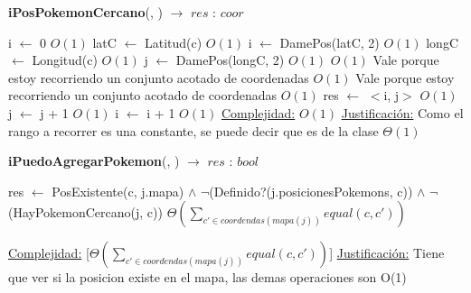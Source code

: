 \begin{algorithm}[H]{\textbf{iPosPokemonCercano}(, )  $\to$ $res$ : $coor$} 
	{}
	\begin{algorithmic}
		\State i $\gets$ 0 \Comment $O(1)$
		\State latC $\gets$ Latitud(c)	\Comment $O(1)$
		\State i $\gets$ DamePos(latC, 2) \Comment $O(1)$		
		\State longC $\gets$ Longitud(c)	\Comment $O(1)$
		\State j $\gets$ DamePos(longC, 2) \Comment $O(1)$
			\Comment $O(1)$ {Vale porque estoy recorriendo un conjunto acotado de coordenadas}
				\Comment $O(1)$ {Vale porque estoy recorriendo un conjunto acotado de coordenadas}
					\Comment $O(1)$
					\State res $\gets$ $<$i, j$>$	\Comment $O(1)$ 
				\EndIf
				\State j $\gets$ j + 1	\Comment $O(1)$
			\EndWhile
			\State i $\gets$ i + 1	\Comment $O(1)$
		\EndWhile
		\medskip
		\Statex \underline{Complejidad:} $O(1)$
		\Statex \underline{Justificación:} Como el rango a recorrer es una constante, se puede decir que es de la clase $\Theta(1)$ 
    \end{algorithmic}
\end{algorithm}

\begin{algorithm}[H]{\textbf{iPuedoAgregarPokemon}(, ) $\to$ $res$ : $bool$} 
	\begin{algorithmic}
		\State res $\gets$ PosExistente(c, j.mapa) $\land$ $\lnot$(Definido?(j.posicionesPokemons, c)) $\land$ $\lnot$(HayPokemonCercano(j, c))  \Comment $\Theta\left(\displaystyle\sum_{c' \in coordendas(mapa(j))}equal(c,c')\right)$
	
		\medskip
		\Statex \underline{Complejidad:} [$\Theta\left(\displaystyle\sum_{c' \in coordendas(mapa(j))}equal(c,c')\right)$]
		\Statex \underline{Justificación:} Tiene que ver si la posicion existe en el mapa, las demas operaciones son O(1)
     \end{algorithmic}
 \end{algorithm}
 
